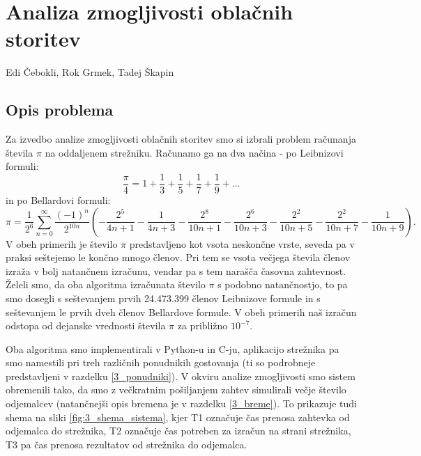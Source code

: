 \chapter[Analiza zmogljivosti oblačnih storitev(Edi Čebokli, Rok Grmek, Tadej Škapin)]{Analiza zmogljivosti oblačnih storitev}

\pagestyle{fancy}
\fancyhf{}
\fancyhead[LE,RO]{\thepage}
\fancyhead[RE,LO]{\leftmark}

\huge Edi Čebokli, Rok Grmek, Tadej Škapin
\normalsize
\bigskip



\section{Opis problema}

Za izvedbo analize zmogljivosti oblačnih storitev smo si izbrali problem računanja števila \(\pi\) na oddaljenem strežniku.
Računamo ga na dva načina - po Leibnizovi \cite{3_leibniz} formuli:
\begin{equation}
    \frac{\pi}{4} = 1 + \frac{1}{3} + \frac{1}{5} + \frac{1}{7} +\frac{1}{9} + ...
\end{equation}
in po Bellardovi \cite{3_bellard} formuli:
\begin{equation}
    \pi = \frac{1}{2^6}\sum_{n=0}^{\infty}\frac{(-1)^n}{2^{10n}}(-\frac{2^5}{4n + 1} - \frac{1}{4n + 3} - \frac{2^8}{10n + 1} - \frac{2^6}{10n + 3} - \frac{2^2}{10n + 5} - \frac{2^2}{10n + 7} - \frac{1}{10n + 9}) .
\end{equation}
V obeh primerih je število \(\pi\) predstavljeno kot vsota neskončne vrste, seveda pa v praksi seštejemo le končno mnogo členov.
Pri tem se vsota večjega števila členov izraža v bolj natančnem izračunu, vendar pa s tem narašča časovna zahtevnost.
Želeli smo, da oba algoritma izračunata število \(\pi\) s podobno natančnostjo, to pa smo dosegli s seštevanjem prvih 24.473.399 členov Leibnizove formule in s seštevanjem le prvih dveh členov Bellardove formule.
V obeh primerih naš izračun odstopa od dejanske vrednosti števila \(\pi\) za približno \(10^{-7}\).

Oba algoritma smo implementirali v Python-u in C-ju, aplikacijo strežnika pa smo namestili pri treh različnih ponudnikih gostovanja (ti so podrobneje predstavljeni v razdelku \ref{3_ponudniki}).
V okviru analize zmogljivosti smo sistem obremenili tako, da smo z večkratnim pošiljanjem zahtev simulirali večje število odjemalcev (natančnejši opis bremena je v razdelku \ref{3_breme}).
To prikazuje tudi shema na sliki \ref{fig:3_shema_sistema}, kjer T1 označuje čas prenosa zahtevka od odjemalca do strežnika, T2 označuje čas potreben za izračun na strani strežnika, T3 pa čas prenosa rezultatov od strežnika do odjemalca.

